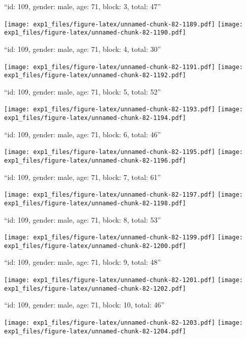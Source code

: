 \documentclass[11pt,,]{article}
\begin{document}
\newpage
[1] 

``id: 109, gender: male, age: 71, block: 3, total: 47''

\texttt{[image: exp1\_files/figure-latex/unnamed-chunk-82-1189.pdf]}
\texttt{[image: exp1\_files/figure-latex/unnamed-chunk-82-1190.pdf]}

\newpage
[1] 

``id: 109, gender: male, age: 71, block: 4, total: 30''

\texttt{[image: exp1\_files/figure-latex/unnamed-chunk-82-1191.pdf]}
\texttt{[image: exp1\_files/figure-latex/unnamed-chunk-82-1192.pdf]}

\newpage
[1] 

``id: 109, gender: male, age: 71, block: 5, total: 52''

\texttt{[image: exp1\_files/figure-latex/unnamed-chunk-82-1193.pdf]}
\texttt{[image: exp1\_files/figure-latex/unnamed-chunk-82-1194.pdf]}

\newpage
[1] 

``id: 109, gender: male, age: 71, block: 6, total: 46''

\texttt{[image: exp1\_files/figure-latex/unnamed-chunk-82-1195.pdf]}
\texttt{[image: exp1\_files/figure-latex/unnamed-chunk-82-1196.pdf]}

\newpage
[1] 

``id: 109, gender: male, age: 71, block: 7, total: 61''

\texttt{[image: exp1\_files/figure-latex/unnamed-chunk-82-1197.pdf]}
\texttt{[image: exp1\_files/figure-latex/unnamed-chunk-82-1198.pdf]}

\newpage
[1] 

``id: 109, gender: male, age: 71, block: 8, total: 53''

\texttt{[image: exp1\_files/figure-latex/unnamed-chunk-82-1199.pdf]}
\texttt{[image: exp1\_files/figure-latex/unnamed-chunk-82-1200.pdf]}

\newpage
[1] 

``id: 109, gender: male, age: 71, block: 9, total: 48''

\texttt{[image: exp1\_files/figure-latex/unnamed-chunk-82-1201.pdf]}
\texttt{[image: exp1\_files/figure-latex/unnamed-chunk-82-1202.pdf]}

\newpage
[1] 

``id: 109, gender: male, age: 71, block: 10, total: 46''

\texttt{[image: exp1\_files/figure-latex/unnamed-chunk-82-1203.pdf]}
\texttt{[image: exp1\_files/figure-latex/unnamed-chunk-82-1204.pdf]}
\end{document}
